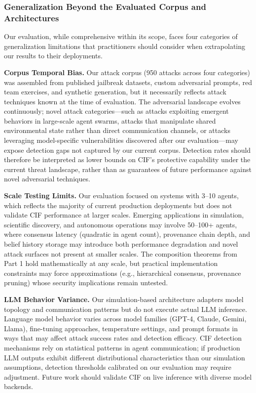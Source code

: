 \documentclass[
]{article}
\begin{document}
\subsubsection{Generalization Beyond the Evaluated Corpus and
Architectures}\label{generalization-beyond-the-evaluated-corpus-and-architectures}

Our evaluation, while comprehensive within its scope, faces four
categories of generalization limitations that practitioners should
consider when extrapolating our results to their deployments.

\textbf{Corpus Temporal Bias.} Our attack corpus (950 attacks across
four categories) was assembled from published jailbreak datasets, custom
adversarial prompts, red team exercises, and synthetic generation, but
it necessarily reflects attack techniques known at the time of
evaluation. The adversarial landscape evolves continuously; novel attack
categories---such as attacks exploiting emergent behaviors in
large-scale agent swarms, attacks that manipulate shared environmental
state rather than direct communication channels, or attacks leveraging
model-specific vulnerabilities discovered after our evaluation---may
expose detection gaps not captured by our current corpus. Detection
rates should therefore be interpreted as lower bounds on CIF's
protective capability under the current threat landscape, rather than as
guarantees of future performance against novel adversarial techniques.

\textbf{Scale Testing Limits.} Our evaluation focused on systems with
3--10 agents, which reflects the majority of current production
deployments but does not validate CIF performance at larger scales.
Emerging applications in simulation, scientific discovery, and
autonomous operations may involve 50--100+ agents, where consensus
latency (quadratic in agent count), provenance chain depth, and belief
history storage may introduce both performance degradation and novel
attack surfaces not present at smaller scales. The composition theorems
from Part 1 hold mathematically at any scale, but practical
implementation constraints may force approximations (e.g., hierarchical
consensus, provenance pruning) whose security implications remain
untested.

\textbf{LLM Behavior Variance.} Our simulation-based architecture
adapters model topology and communication patterns but do not execute
actual LLM inference. Language model behavior varies across model
families (GPT-4, Claude, Gemini, Llama), fine-tuning approaches,
temperature settings, and prompt formats in ways that may affect attack
success rates and detection efficacy. CIF detection mechanisms rely on
statistical patterns in agent communication; if production LLM outputs
exhibit different distributional characteristics than our simulation
assumptions, detection thresholds calibrated on our evaluation may
require adjustment. Future work should validate CIF on live inference
with diverse model backends.
\end{document}
